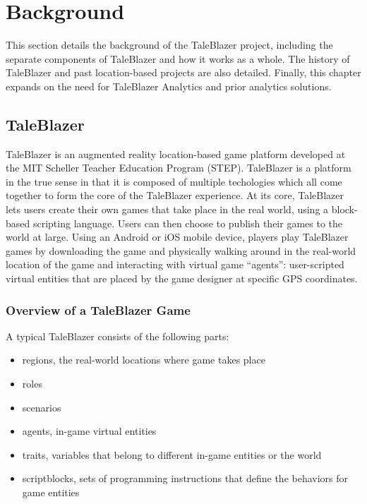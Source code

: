 \chapter{Background}

This section details the background of the TaleBlazer project, including the separate components of TaleBlazer and how it works as a whole. The history of TaleBlazer and past location-based projects are also detailed. Finally, this chapter expands on the need for TaleBlazer Analytics and prior analytics solutions. 

\section{TaleBlazer}

TaleBlazer is an augmented reality location-based game platform developed at the MIT Scheller Teacher Education Program (STEP). TaleBlazer is a platform in the true sense in that it is composed of multiple techologies which all come together to form the core of the TaleBlazer experience. At its core, TaleBlazer lets users create their own games that take place in the real world, using a block-based scripting language. Users can then choose to publish their games to the world at large. Using an Android or iOS mobile device, players play TaleBlazer games by downloading the game and physically walking around in the real-world location of the game and interacting with virtual game ``agents'': user-scripted virtual entities that are placed by the game designer at specific GPS coordinates.

\subsection{Overview of a TaleBlazer Game}

A typical TaleBlazer consists of the following parts: 
	\begin{itemize}
		\item regions, the real-world locations where game takes place
		\item roles
		\item scenarios
		\item agents, in-game virtual entities
		\item traits, variables that belong to different in-game entities or the world
		\item scriptblocks, sets of programming instructions that define the behaviors for game entities
	\end{itemize}

